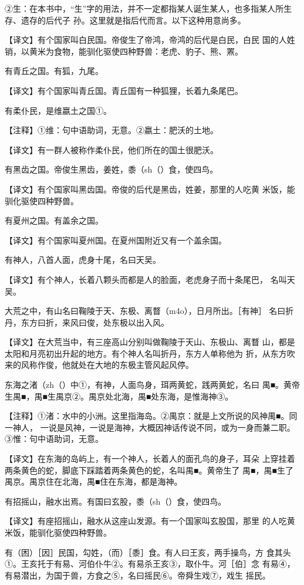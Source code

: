 \documentclass[a4paper,12pt,UTF8,twoside]{ctexbook}
\begin{document}
②生：在本书中，“生”字的用法，并不一定都指某人诞生某人，也多指某人所生存、遗存的后代子 孙。这里就是指后代而言。以下这种用意尚多。

【译文】有个国家叫白民国。帝俊生了帝鸿，帝鸿的后代是白民，白民 国的人姓销，以黄米为食物，能驯化驱使四种野兽：老虎、豹子、熊、罴。

有青丘之国。有狐，九尾。

【译文】有个国家叫青丘国。青丘国有一种狐狸，长着九条尾巴。

有柔仆民，是维嬴土之国①。

【注释】①维：句中语助词，无意。②嬴土：肥沃的土地。

【译文】有一群人被称作柔仆民，他们所在的国土很肥沃。

有黑齿之国。帝俊生黑齿，姜姓，黍（sh（）食，使四鸟。

【译文】有个国家叫黑齿国。帝俊的后代是黑齿，姓姜，那里的人吃黄 米饭，能驯化驱使四种野兽。

有夏州之国。有盖余之国。

【译文】有个国家叫夏州国。在夏州国附近又有一个盖余国。

有神人，八首人面，虎身十尾，名曰天吴。

【译文】有个神人，长着八颗头而都是人的脸面，老虎身子而十条尾巴， 名叫天吴。

大荒之中，有山名曰鞠陵于天、东极、离瞀（m4o），日月所出。［有神］ 名曰折丹，东方曰折，来风曰俊，处东极以出入风。

【译文】在大荒当中，有三座高山分别叫做鞠陵于天山、东极山、离瞀 山，都是太阳和月亮初出升起的地方。有个神人名叫折丹，东方人单称他为 折，从东方吹来的风称作俊，他就处在大地的东极主管风起风停。

东海之渚（zh（）中①，有神，人面鸟身，珥两黄蛇，践两黄蛇，名曰 禺■。黄帝生禺■，禺■生禺京②。禺京处北海，禺■处东海，是惟海神③。

【注释】①渚：水中的小洲。这里指海岛。②禺京：就是上文所说的风神禺■。同一神人， 一说是风神，一说是海神，大概因神话传说不同，或为一身而兼二职。③惟：句中语助词，无意。

【译文】在东海的岛屿上，有一个神人，长着人的面孔鸟的身子，耳朵 上穿挂着两条黄色的蛇，脚底下踩踏着两条黄色的蛇，名叫禺■。黄帝生了 禺■，禺■生了禺京。禺京住在北海，禺■住在东海，都是海神。

有招摇山，融水出焉。有国曰玄股，黍（sh（）食，使四鸟。

【译文】有座招摇山，融水从这座山发源。有一个国家叫玄股国，那里 的人吃黄米饭，能驯化驱使四种野兽。

有（困）［因］民国，勾姓，（而）［黍］食。有人曰王亥，两手操鸟，方 食其头①。王亥托于有易、河伯仆牛②。有易杀王亥③，取仆牛。河［伯］念 有易④，有易潜出，为国于兽，方食之⑤，名曰摇民⑥。帝舜生戏⑦，戏生 摇民。
\end{document}
